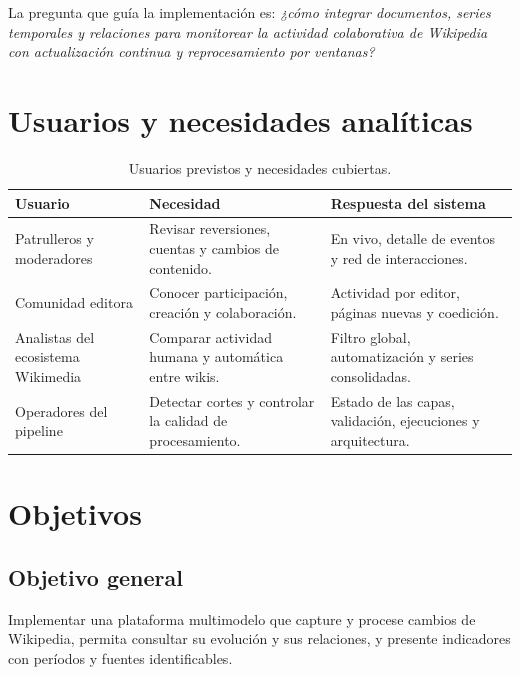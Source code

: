 La pregunta que guía la implementación es: \textit{¿cómo integrar documentos, series temporales y relaciones para monitorear la actividad colaborativa de Wikipedia con actualización continua y reprocesamiento por ventanas?}

\section{Usuarios y necesidades analíticas}
\begin{table}[H]\centering\small{}\renewcommand{\arraystretch}{1.2}
\begin{tabularx}{\textwidth}{P{3.0cm}YY}
\toprule
Usuario & Necesidad & Respuesta del sistema \\
\midrule
Patrulleros y moderadores & Revisar reversiones, cuentas y cambios de contenido. & En vivo, detalle de eventos y red de interacciones. \\
Comunidad editora & Conocer participación, creación y colaboración. & Actividad por editor, páginas nuevas y coedición. \\
Analistas del ecosistema Wikimedia & Comparar actividad humana y automática entre wikis. & Filtro global, automatización y series consolidadas. \\
Operadores del pipeline & Detectar cortes y controlar la calidad de procesamiento. & Estado de las capas, validación, ejecuciones y arquitectura. \\
\bottomrule
\end{tabularx}
\caption{Usuarios previstos y necesidades cubiertas.}
\end{table}

\section{Objetivos}
\subsection{Objetivo general}
Implementar una plataforma multimodelo que capture y procese cambios de Wikipedia, permita consultar su evolución y sus relaciones, y presente indicadores con períodos y fuentes identificables.

